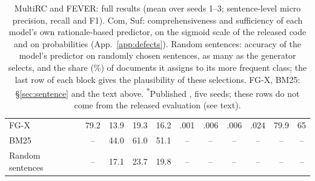 \documentclass[11pt]{article}
\begin{document}
\begin{table}[t]
\begin{tabular}{@{}lcccccccccc@{}}
FG-X & 79.2 & 13.9 & 19.3 & 16.2 & .001 & .006 & .006 & .024 & 79.9 & 65 \\
BM25 & -- & 44.0 & 61.0 & 51.1 & -- & -- & -- & -- & -- & -- \\
Random sentences & -- & 17.1 & 23.7 & 19.8 & -- & -- & -- & -- & -- & -- \\
\bottomrule
\end{tabular}
\caption{MultiRC and FEVER: full results (mean over seeds 1--3; sentence-level micro precision, recall and F1). Com, Suf: comprehensiveness and sufficiency of each model's own rationale-based predictor, on the sigmoid scale of the released code and on probabilities (App.~\ref{app:defects}). Random sentences: accuracy of the model's predictor on randomly chosen sentences, as many as the generator selects, and the share (\%) of documents it assigns to its more frequent class; the last row of each block gives the plausibility of these selections. FG-X, BM25: \S\ref{sec:sentence} and the text above. \textsuperscript{$\ast$}Published \citep{storek-etal-2023-unsupervised}, five seeds; these rows do not come from the released evaluation (see text).}
\label{tab:sentence-full}
\end{table}
\end{document}
